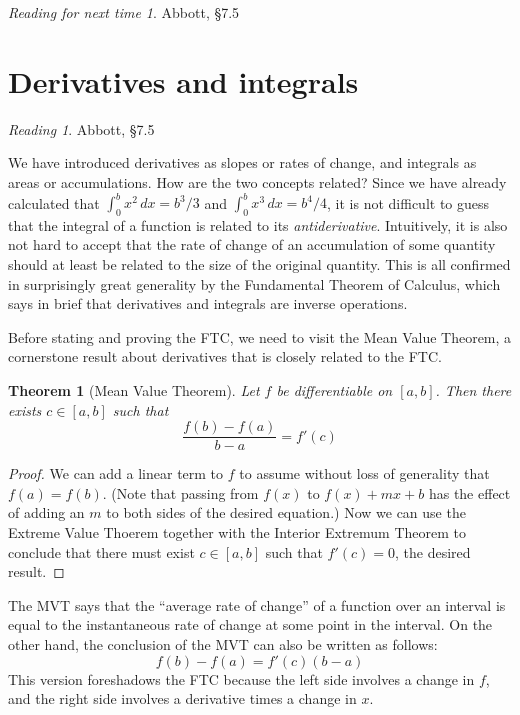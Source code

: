 \documentclass[11pt,oneside]{amsbook}
\theoremstyle{definition}
\theoremstyle{plain}
\newtheorem{theorem}{Theorem}[section]
\theoremstyle{definition}
\theoremstyle{remark}
\newtheorem*{reading}{Reading}
\newtheorem*{readnext}{Reading for next time}
\numberwithin{equation}{section}
\numberwithin{figure}{section}
\begin{document}
\begin{readnext}
  Abbott, \S 7.5
\end{readnext}

\newpage
\section{Derivatives and integrals}

\begin{reading}
  Abbott, \S 7.5
\end{reading}

We have introduced derivatives as slopes or rates of change, and integrals as areas or accumulations. How are the two concepts related? Since we have already calculated that $\int_0^b x^2\,dx=b^3/3$ and $\int_0^b x^3\,dx=b^4/4$, it is not difficult to guess that the integral of a function is related to its \emph{antiderivative}. Intuitively, it is also not hard to accept that the rate of change of an accumulation of some quantity should at least be related to the size of the original quantity. This is all confirmed in surprisingly great generality by the Fundamental Theorem of Calculus, which says in brief that derivatives and integrals are inverse operations.

Before stating and proving the FTC, we need to visit the Mean Value Theorem, a cornerstone result about derivatives that is closely related to the FTC.

\begin{theorem}[Mean Value Theorem]
  Let $f$ be differentiable on $[a,b]$. Then there exists $c\in[a,b]$ such that
  \[\frac{f(b)-f(a)}{b-a}=f'(c)
  \]
\end{theorem}

\begin{proof}
  We can add a linear term to $f$ to assume without loss of generality that $f(a)=f(b)$. (Note that passing from $f(x)$ to $f(x)+mx+b$ has the effect of adding an $m$ to both sides of the desired equation.) Now we can use the Extreme Value Thoerem together with the Interior Extremum Theorem to conclude that there must exist $c\in[a,b]$ such that $f'(c)=0$, the desired result.
\end{proof}

The MVT says that the ``average rate of change'' of a function over an interval is equal to the instantaneous rate of change at some point in the interval. On the other hand, the conclusion of the MVT can also be written as follows:
\[f(b)-f(a)=f'(c)(b-a)
\]
This version foreshadows the FTC because the left side involves a change in $f$, and the right side involves a derivative times a change in $x$.
\end{document}
